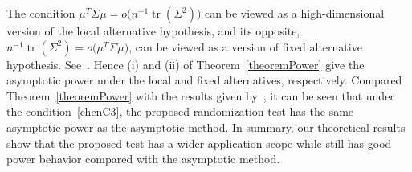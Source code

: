 \documentclass[3p]{elsarticle}
\DeclareMathOperator{\mytr}{tr}
\theoremstyle{plain}
\theoremstyle{definition}
\newtheorem{remark}{\quad\quad Remark}
\theoremstyle{remark}
\begin{document}






The condition $\mu^T \Sigma \mu= o\big(n^{-1}\mytr(\Sigma^2)\big)$ can be viewed as a high-dimensional version of the local alternative hypothesis, and its opposite, $n^{-1}\mytr(\Sigma^2)= o\big(\mu^T \Sigma \mu\big)$, can be viewed as a version of fixed alternative hypothesis. See~\cite{Chen2010A}.
Hence (i) and (ii) of Theorem~\ref{theoremPower} give the asymptotic power under the local and fixed alternatives, respectively.
Compared Theorem~\ref{theoremPower} with the results given by~\cite{Chen2010A}, it can be seen that under the condition~\eqref{chenC3}, the proposed randomization test has the same asymptotic power as the asymptotic method.
In summary, our theoretical results show that the proposed test has a wider application scope while still has good power behavior compared with the asymptotic method.
\end{document}
